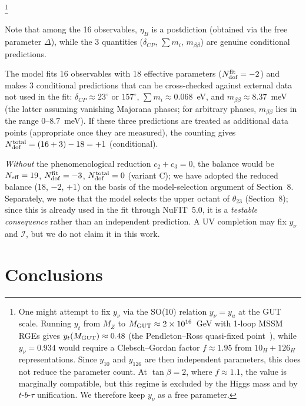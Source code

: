 \documentclass[12pt,a4paper]{article}
\numberwithin{equation}{section}
\begin{document}
\vspace{0.3cm}
\noindent\footnote{One might attempt to fix \(y_\nu\) via the SO(10) relation \(y_\nu = y_u\) at the GUT scale. Running \(y_t\) from \(M_Z\) to \(M_{\rm GUT} \approx 2\times 10^{16}\)~GeV with 1-loop MSSM RGEs gives \(y_t(M_{\rm GUT}) \approx 0.48\) (the Pendleton--Ross quasi-fixed point~\cite{PendletonRoss1981}), while \(y_\nu = 0.934\) would require a Clebsch--Gordan factor \(f \approx 1.95\) from \(10_H + 126_H\) representations. Since \(y_{10}\) and \(y_{126}\) are then independent parameters, this does not reduce the parameter count. At \(\tan\beta = 2\), where \(f \approx 1.1\), the value is marginally compatible, but this regime is excluded by the Higgs mass and by \(t\)-\(b\)-\(\tau\) unification. We therefore keep \(y_\nu\) as a free parameter.}

Note that among the 16 observables, \(\eta_B\) is a postdiction (obtained via the free parameter \(\Delta\)), while the 3 quantities (\(\delta_{CP}\), \(\sum m_i\), \(m_{\beta\beta}\)) are genuine conditional predictions.

The model fits 16 observables with 18 effective parameters
(\(N_{\rm dof}^{\rm fit} = -2\)) and makes 3 conditional predictions
that can be cross-checked against external data not used in the fit:
\(\delta_{CP} \approx 23^\circ\) or \(157^\circ\),
\(\sum m_i \approx 0.068\)~eV, and
\(m_{\beta\beta} \approx 8.37\)~meV (the latter assuming vanishing
Majorana phases; for arbitrary phases, \(m_{\beta\beta}\) lies in the
range \(0\)--\(8.7\)~meV). If these three predictions are treated as
additional data points (appropriate once they are measured), the
counting gives \(N_{\rm dof}^{\rm total} = (16+3) - 18 = +1\) (conditional).

\emph{Without} the phenomenological reduction \(c_2 + c_3 = 0\),
the balance would be \(N_{\rm eff} = 19\),
\(N_{\rm dof}^{\rm fit} = -3\), \(N_{\rm dof}^{\rm total} = 0\)
(variant C); we have adopted the reduced balance
(18, \(-2\), \(+1\)) on the basis of the model-selection argument of
Section~8. Separately, we note that the model selects the upper
octant of \(\theta_{23}\) (Section~8); since this is already used in
the fit through NuFIT~5.0, it is a \emph{testable consequence} rather
than an independent prediction. A UV completion may fix \(y_\nu\) and
\(\mathcal{I}\), but we do not claim it in this work.

\section{Conclusions}
\end{document}
